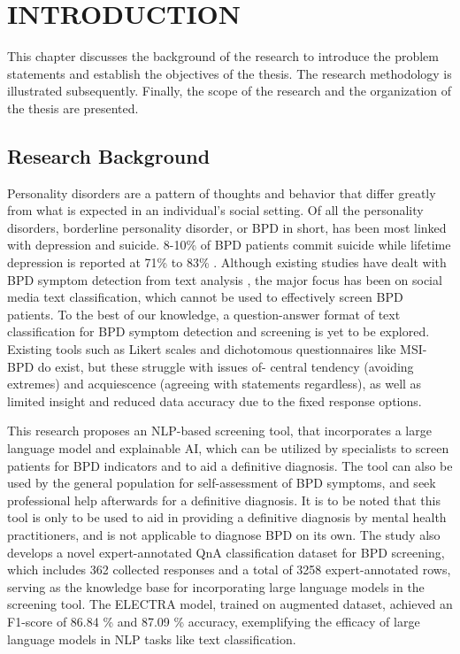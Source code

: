 
\chapter{INTRODUCTION}
\onehalfspacing
\label{intro}
\vspace{-3em}

This chapter discusses the background of the research to introduce the problem statements
and establish the objectives of the thesis. The research methodology is illustrated subsequently. Finally, the scope of the research and the organization of the thesis are presented.

\section{Research  Background}
Personality disorders are a pattern of thoughts and behavior that differ greatly from what is expected in an individual's social setting. Of all the personality disorders, borderline personality disorder, or BPD in short, has been most linked with depression and suicide. 8-10\% of BPD patients commit suicide \cite{APA2013} while lifetime depression is reported at 71\% to 83\% \cite{biskin2013comorbidities}. Although existing studies have dealt with BPD symptom detection from text analysis \cite{jain2024text} \cite{ellouze2022deep} \cite{singh2020framework} \cite{ellouze2022hybrid}, the major focus has been on social media text classification, which cannot be used to effectively screen BPD patients. To the best of our knowledge, a question-answer format of text classification for BPD symptom detection and screening is yet to be explored. Existing tools such as Likert scales and dichotomous questionnaires like MSI-BPD \cite{zanarini2003screening} do exist, but these struggle with issues of- central tendency (avoiding extremes) and acquiescence (agreeing with statements regardless), as well as limited insight and reduced data accuracy due to the fixed response options.

This research proposes an NLP-based screening tool, that incorporates a large language model and explainable AI, which can be utilized by specialists to screen patients for BPD indicators and to aid a definitive diagnosis. The tool can also be used by the general population for self-assessment of BPD symptoms, and seek professional help afterwards for a definitive diagnosis. It is to be noted that this tool is only to be used to aid in providing a definitive diagnosis by mental health practitioners, and is not applicable to diagnose BPD on its own. The study also develops a novel expert-annotated QnA classification dataset for BPD screening, which includes 362 collected responses and a total of 3258 expert-annotated rows, serving as the knowledge base for incorporating large language models in the screening tool. The ELECTRA model, trained on augmented dataset, achieved an F1-score of 86.84 \% and  87.09 \% accuracy, exemplifying the efficacy of large language models in NLP tasks like text classification.

